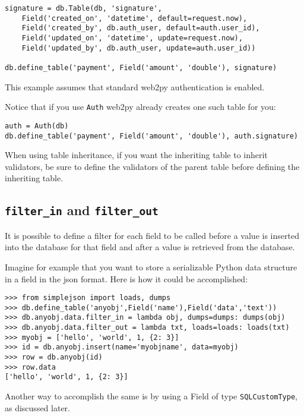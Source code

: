 \documentclass[justified,sixbynine,notoc]{tufte-book}
\def\ft{\small\tt}
\def\inxx#1{\index{#1}}
\begin{document}
\begin{fullwidth}
\begin{lstlisting}
signature = db.Table(db, 'signature',
    Field('created_on', 'datetime', default=request.now),
    Field('created_by', db.auth_user, default=auth.user_id),
    Field('updated_on', 'datetime', update=request.now),
    Field('updated_by', db.auth_user, update=auth.user_id))

db.define_table('payment', Field('amount', 'double'), signature)
\end{lstlisting}

This example assumes that standard web2py authentication is enabled.

Notice that if you use {\ft Auth} web2py already creates one such table for you:

\begin{lstlisting}
auth = Auth(db)
db.define_table('payment', Field('amount', 'double'), auth.signature)
\end{lstlisting}

When using table inheritance, if you want the inheriting table to inherit validators, be sure to define the validators of the parent table before defining the inheriting table.

\goodbreak\subsection{{\ft filter\_in} and {\ft filter\_out}}

\inxx{filter\_in} \inxx{filter\_out}

It is possible to define a filter for each field to be called before a value is inserted into the database for that field and after a value is retrieved from the database.

Imagine for example that you want to store a serializable Python data structure in a field in the json format. Here is how it could be accomplished:

\begin{lstlisting}
>>> from simplejson import loads, dumps
>>> db.define_table('anyobj',Field('name'),Field('data','text'))
>>> db.anyobj.data.filter_in = lambda obj, dumps=dumps: dumps(obj)
>>> db.anyobj.data.filter_out = lambda txt, loads=loads: loads(txt)
>>> myobj = ['hello', 'world', 1, {2: 3}]
>>> id = db.anyobj.insert(name='myobjname', data=myobj)
>>> row = db.anyobj(id)
>>> row.data
['hello', 'world', 1, {2: 3}]
\end{lstlisting}

Another way to accomplish the same is by using a Field of type {\ft SQLCustomType}, as discussed later.


\end{fullwidth}
\end{document}
